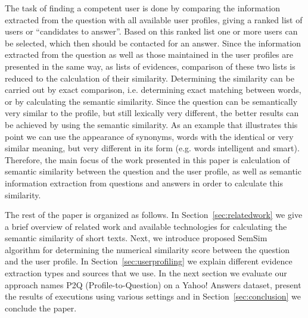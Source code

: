 \documentclass[conference]{IEEEtran}
\newcommand{\secref}[1]{Section~\ref{#1}}
\begin{document}
The task of finding a competent user is done by comparing the information extracted from the question with all available user profiles, giving a ranked list of users or ``candidates to answer''. Based on this ranked list one or more users can be selected, which then should be contacted for an answer. Since the information extracted from the question as well as those maintained in the user profiles are presented in the same way, as lists of evidences, comparison of these two lists is reduced to the calculation of their similarity. Determining the similarity can be carried out by exact comparison, i.e. determining exact matching between words, or by calculating the semantic similarity. Since the question can be semantically very similar to the profile, but still lexically very different, the better results can be achieved by using the semantic similarity. As an example that illustrates this point we can use the appearance of synonyms, words with the identical or very similar meaning, but very different in its form (e.g. words intelligent and smart). Therefore, the main focus of the work presented in this paper is calculation of semantic similarity between the question and the user profile, as well as semantic information extraction from questions and answers in order to calculate this similarity.

The rest of the paper is organized as follows. In \secref{sec:relatedwork} we give a brief overview of related work and available technologies for calculating the semantic similarity of short texts. Next, we introduce proposed SemSim algorithm for determining the numerical similarity score between the question and the user profile. In \secref{sec:userprofiling} we explain different evidence extraction types and sources that we use. In the next section we evaluate our approach names P2Q (Profile-to-Question) on a Yahoo! Answers dataset, present the results of executions using various settings and in \secref{sec:conclusion} we conclude the paper. 




%
%
\end{document}
